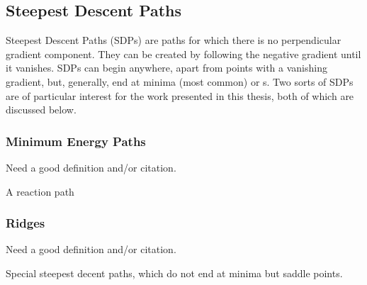 \subsection{Steepest Descent Paths}
\label{sec:sdps}

Steepest Descent Paths (SDPs) are paths for which there is no perpendicular gradient component.
They can be created by following the negative gradient until it vanishes.
SDPs can begin anywhere, apart from points with a vanishing gradient, but, generally, end at minima (most common) or \sap{}s.
Two sorts of SDPs are of particular interest for the work presented in this thesis, both of which are discussed below.

\subsubsection{Minimum Energy Paths}
\label{sec:meps}

\bit
\item Need a good definition and/or citation.
\item A reaction path
\eit

\placeholder

\subsubsection{Ridges}
\label{sec:ridges}

\bit
\item Need a good definition and/or citation.
\item Special steepest decent paths, which do not end at minima but saddle points.
\eit

\placeholder


